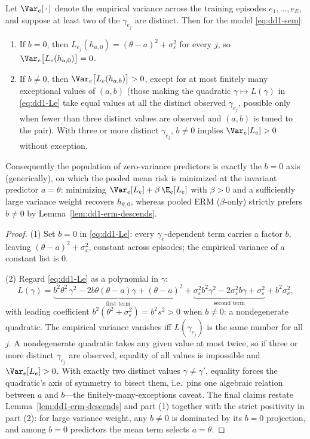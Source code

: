 \begin{proposition}
\label{prop:dd1-variance-detects}
Let $\Var_e[\,\cdot\,]$ denote the empirical variance across the training
episodes $e_1, \dots, e_E$, and suppose at least two of the
$\gamma_{e_j}$ are distinct. Then for the model
\eqref{eq:dd1-sem}:
\begin{enumerate}
\item If $b = 0$, then $L_{e_j}(h_{a, 0}) = (\theta - a)^2 +
\sigma_\varepsilon^2$ for every $j$, so $\Var_e\bigl[ L_e(h_{a,0}) \bigr] =
0$.
\item If $b \neq 0$, then $\Var_e\bigl[ L_e(h_{a,b}) \bigr] > 0$, except for
at most finitely many exceptional values of $(a, b)$ (those making the
quadratic $\gamma \mapsto L(\gamma)$ in \eqref{eq:dd1-Le} take equal values
at all the distinct observed $\gamma_{e_j}$, possible only when fewer than
three distinct values are observed and $(a,b)$ is tuned to the pair).
With three or more distinct $\gamma_{e_j}$, $b \neq 0$ implies
$\Var_e[L_e] > 0$ without exception.
\end{enumerate}
Consequently the population of zero-variance predictors is exactly the
$b = 0$ axis (generically), on which the pooled mean risk is minimized at
the invariant predictor $a = \theta$: minimizing
$\Var_e[L_e] + \beta\, \E_e[L_e]$ with $\beta > 0$ and a sufficiently large
variance weight recovers $h_{\theta, 0}$, whereas pooled ERM
($\beta$-only) strictly prefers $\widehat b \neq 0$ by
Lemma~\ref{lem:dd1-erm-descends}.
\end{proposition}

\begin{proof}
(1) Set $b = 0$ in \eqref{eq:dd1-Le}: every $\gamma_e$-dependent term carries
a factor $b$, leaving $(\theta - a)^2 + \sigma_\varepsilon^2$, constant
across episodes; the empirical variance of a constant list is $0$.

(2) Regard \eqref{eq:dd1-Le} as a polynomial in $\gamma$:
\[
L(\gamma) = \underbrace{b^2\theta^2 \,\gamma^2 - 2b\theta(\theta - a)\gamma
+ (\theta - a)^2}_{\text{first term}}
+ \underbrace{\sigma_\varepsilon^2 b^2 \gamma^2 - 2\sigma_\varepsilon^2 b
\gamma + \sigma_\varepsilon^2}_{\text{second term}} + b^2\sigma_\nu^2,
\]
with leading coefficient $b^2(\theta^2 + \sigma_\varepsilon^2) = b^2 s^2 > 0$
when $b \neq 0$: a nondegenerate quadratic. The empirical variance vanishes
iff $L(\gamma_{e_j})$ is the same number for all $j$. A nondegenerate
quadratic takes any given value at most twice, so if three or more distinct
$\gamma_{e_j}$ are observed, equality of all values is impossible and
$\Var_e[L_e] > 0$. With exactly two distinct values $\gamma \neq \gamma'$,
equality forces the quadratic's axis of symmetry to bisect them, i.e.\ pins
one algebraic relation between $a$ and $b$---the finitely-many-exceptions
caveat. The final claims restate Lemma~\ref{lem:dd1-erm-descends} and part
(1) together with the strict positivity in part (2): for large variance
weight, any $b \neq 0$ is dominated by its $b = 0$ projection, and among
$b = 0$ predictors the mean term selects $a = \theta$.
\end{proof}


